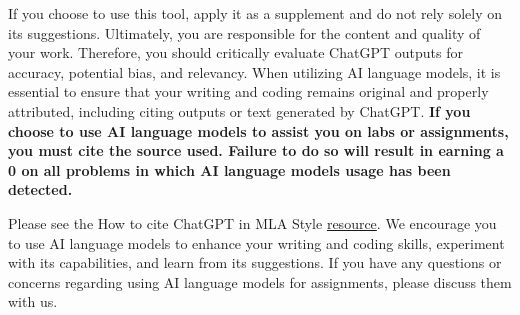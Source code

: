 \documentclass[
]{article}
\begin{document}
If you choose to use this tool, apply it as a supplement and do not rely
solely on its suggestions. Ultimately, you are responsible for the
content and quality of your work. Therefore, you should critically
evaluate ChatGPT outputs for accuracy, potential bias, and relevancy.
When utilizing AI language models, it is essential to ensure that your
writing and coding remains original and properly attributed, including
citing outputs or text generated by ChatGPT. \textbf{If you choose to
use AI language models to assist you on labs or assignments, you must
cite the source used. Failure to do so will result in earning a 0 on all
problems in which AI language models usage has been detected.}

Please see the How to cite ChatGPT in MLA Style
\href{https://style.mla.org/citing-generative-ai/}{resource}. We
encourage you to use AI language models to enhance your writing and
coding skills, experiment with its capabilities, and learn from its
suggestions. If you have any questions or concerns regarding using AI
language models for assignments, please discuss them with us.
\end{document}
